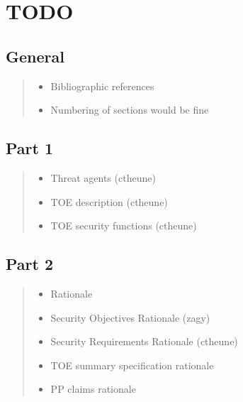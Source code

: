 \documentclass[12pt,english]{scrbook}
\begin{document}



\chapter{TODO}





\section{General}
\begin{quote}
\begin{itemize}
\item {} 
Bibliographic references

\item {} 
Numbering of sections would be fine

\end{itemize}
\end{quote}





\section{Part 1}
\begin{quote}
\begin{itemize}
\item {} 
Threat agents (ctheune)

\item {} 
TOE description (ctheune)

\item {} 
TOE security functions (ctheune)

\end{itemize}
\end{quote}





\section{Part 2}
\begin{quote}
\begin{itemize}
\item {} 
Rationale

\item {} 
Security Objectives Rationale (zagy)

\item {} 
Security Requirements Rationale (ctheune)

\item {} 
TOE summary specification rationale

\item {} 
PP claims rationale

\end{itemize}
\end{quote}
\end{document}
